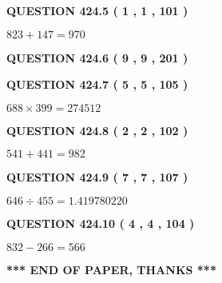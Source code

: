 \documentclass{ctexart}
\begin{document}
  
  
\vspace{0.2in}
  
{\textbf{\Large{QUESTION
424.5 
 ( 1 , 1 , 101 )
}}}
  
  
 
 

$ %
823 +  %
147=   %
970$
 
 
  
\vspace{0.2in}
  
{\textbf{\Large{QUESTION
424.6 
 ( 9 , 9 , 201 )
}}}
  
  
  
\vspace{0.2in}
  
{\textbf{\Large{QUESTION
424.7 
 ( 5 , 5 , 105 )
}}}
  
  
 
 

$ %
688 \times  %
399=   %
274512$
 
 
  
\vspace{0.2in}
  
{\textbf{\Large{QUESTION
424.8 
 ( 2 , 2 , 102 )
}}}
  
  
 
 

$ %
541 +  %
441=   %
982$
 
 
  
\vspace{0.2in}
  
{\textbf{\Large{QUESTION
424.9 
 ( 7 , 7 , 107 )
}}}
  
  
 
 

$ %
646 \div  %
455=   %
1.419780220$
 
 
  
\vspace{0.2in}
  
{\textbf{\Large{QUESTION
424.10 
 ( 4 , 4 , 104 )
}}}
  
  
 
 

$ %
832 -  %
266=   %
566$
 
 
   
   
 \vspace{0.2in}
 
   
   
   
   
\vspace{1.0in} 
{\textbf{\large{ *** END OF PAPER, THANKS *** }}} 
   
\end{document}
